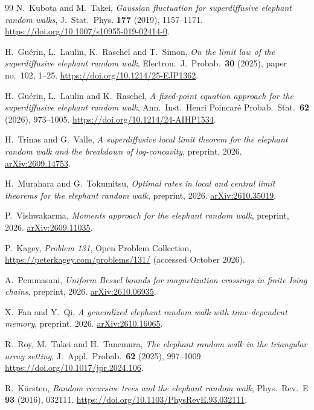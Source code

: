 \documentclass[EJP,preprint]{ejpecp}
\begin{document}
\begin{thebibliography}{99}
N.~Kubota and M.~Takei, \emph{Gaussian fluctuation for superdiffusive
elephant random walks}, J.~Stat.~Phys. \textbf{177} (2019), 1157--1171.
\url{https://doi.org/10.1007/s10955-019-02414-0}.

H.~Gu\'erin, L.~Laulin, K.~Raschel and T.~Simon, \emph{On the limit law of
the superdiffusive elephant random walk}, Electron.\ J.\ Probab.\
\textbf{30} (2025), paper no.~102, 1--25. \url{https://doi.org/10.1214/25-EJP1362}.

H.~Gu\'erin, L.~Laulin and K.~Raschel, \emph{A fixed-point equation approach
for the superdiffusive elephant random walk}, Ann.\ Inst.\ Henri Poincar\'e
Probab.\ Stat.\ \textbf{62} (2026), 973--1005.
\url{https://doi.org/10.1214/24-AIHP1534}.

H.~Trinas and G.~Valle, \emph{A superdiffusive local limit theorem for the
elephant random walk and the breakdown of log-concavity}, preprint, 2026.
\href{https://arxiv.org/abs/2609.14753}{arXiv:2609.14753}.

H.~Murahara and G.~Tokumitsu, \emph{Optimal rates in local and central limit
theorems for the elephant random walk}, preprint, 2026.
\href{https://arxiv.org/abs/2610.35019}{arXiv:2610.35019}.

P.~Vishwakarma, \emph{Moments approach for the elephant random walk},
preprint, 2026.
\href{https://arxiv.org/abs/2609.11035}{arXiv:2609.11035}.

P.~Kagey, \emph{Problem 131}, Open Problem Collection,
\url{https://peterkagey.com/problems/131/} (accessed October 2026).

A.~Pemmasani, \emph{Uniform Bessel bounds for magnetization crossings in
finite Ising chains}, preprint, 2026.
\href{https://arxiv.org/abs/2610.06935}{arXiv:2610.06935}.

X.~Fan and Y.~Qi, \emph{A generalized elephant random walk with time-dependent
memory}, preprint, 2026.
\href{https://arxiv.org/abs/2610.16065}{arXiv:2610.16065}.

R.~Roy, M.~Takei and H.~Tanemura, \emph{The elephant random walk in the
triangular array setting}, J.\ Appl.\ Probab.\ \textbf{62} (2025), 997--1009.
\url{https://doi.org/10.1017/jpr.2024.106}.

R.~K\"ursten, \emph{Random recursive trees and the elephant random walk},
Phys.\ Rev.\ E \textbf{93} (2016), 032111.
\url{https://doi.org/10.1103/PhysRevE.93.032111}.


\end{thebibliography}
\end{document}
